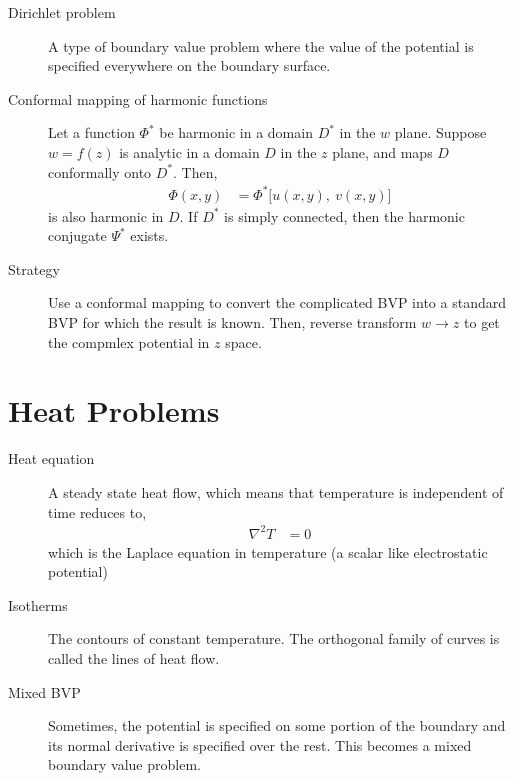 \begin{description}
    \item[Dirichlet problem] A type of boundary value problem where the value of the
        potential is specified everywhere on the boundary surface.

    \item[Conformal mapping of harmonic functions] Let a function $ \Phi^* $ be
        harmonic in a domain $ D^* $ in the $ w $ plane.
        Suppose $ w = f(z) $ is analytic in a domain $ D $ in the $ z $ plane, and maps
        $ D $ conformally onto $ D^* $. Then,
        \begin{align}
            \Phi(x, y) & = \Phi^*\Big[u(x, y),\ v(x, y) \Big]
        \end{align}
        is also harmonic in $ D $. If $ D^* $ is simply connected, then the harmonic
        conjugate $ \Psi^* $ exists.

    \item[Strategy] Use a conformal mapping to convert the complicated BVP into a
        standard BVP for which the result is known. Then, reverse transform
        $ w \to z $ to get the compmlex potential in $ z $ space.

\end{description}

\section{Heat Problems}

\begin{description}
    \item[Heat equation] A steady state heat flow, which means that temperature is
        independent of time reduces to,
        \begin{align}
            \nabla^2 T & = 0
        \end{align}
        which is the Laplace equation in temperature (a scalar like electrostatic
        potential)

    \item[Isotherms] The contours of constant temperature. The orthogonal family of
        curves is called the lines of heat flow.

    \item[Mixed BVP] Sometimes, the potential is specified on some portion of the
        boundary and its normal derivative is specified over the rest. This becomes a
        mixed boundary value problem.
\end{description}

